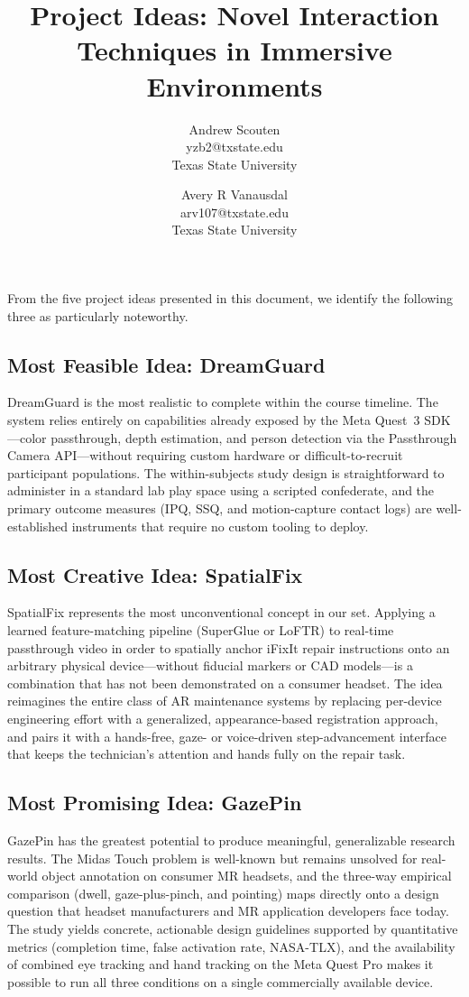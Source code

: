 \documentclass{styling/vgtc}                          %
\title{Project Ideas: Novel Interaction Techniques in Immersive Environments}
\author{Andrew Scouten\\ %
        \scriptsize{yzb2@txstate.edu}\\ %
        \scriptsize Texas State University
\and Avery R Vanausdal\\ %
        \scriptsize{arv107@txstate.edu}\\ %
        \scriptsize Texas State University}
\begin{document}

\maketitle

From the five project ideas presented in this document, we identify the following three as
particularly noteworthy.

\subsection{Most Feasible Idea: DreamGuard}

DreamGuard is the most realistic to complete within the course timeline. The system relies
entirely on capabilities already exposed by the Meta Quest~3 SDK---color passthrough,
depth estimation, and person detection via the Passthrough Camera API---without requiring
custom hardware or difficult-to-recruit participant populations. The within-subjects
study design is straightforward to administer in a standard lab play space using a scripted
confederate, and the primary outcome measures (IPQ, SSQ, and motion-capture contact
logs) are well-established instruments that require no custom tooling to deploy.

\subsection{Most Creative Idea: SpatialFix}

SpatialFix represents the most unconventional concept in our set. Applying a learned
feature-matching pipeline (SuperGlue or LoFTR) to real-time passthrough video in order to
spatially anchor iFixIt repair instructions onto an arbitrary physical device---without
fiducial markers or CAD models---is a combination that has not been demonstrated on a
consumer headset. The idea reimagines the entire class of AR maintenance systems by
replacing per-device engineering effort with a generalized, appearance-based registration
approach, and pairs it with a hands-free, gaze- or voice-driven step-advancement interface
that keeps the technician's attention and hands fully on the repair task.

\subsection{Most Promising Idea: GazePin}

GazePin has the greatest potential to produce meaningful, generalizable research results.
The Midas Touch problem is well-known but remains unsolved for real-world object
annotation on consumer MR headsets, and the three-way empirical comparison (dwell,
gaze-plus-pinch, and pointing) maps directly onto a design question that headset
manufacturers and MR application developers face today. The study yields concrete,
actionable design guidelines supported by quantitative metrics (completion time, false
activation rate, NASA-TLX), and the availability of combined eye tracking and hand
tracking on the Meta Quest Pro makes it possible to run all three conditions on a single
commercially available device.
\end{document}

